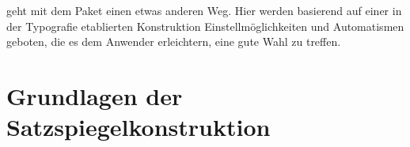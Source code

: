 \KOMAScript{} geht mit dem Paket  einen etwas anderen
Weg. Hier werden basierend auf einer in der Typografie etablierten
Konstruktion Einstellmöglichkeiten und Automatismen geboten, die es dem
Anwender erleichtern, eine gute Wahl zu treffen.

\iffalse%
  Es wird darauf hingewiesen, dass sich \Package{typearea} des Pakets
  \Package{scrbase} bedient. Letzteres Paket ist im Expertenteil
  \iffree{dieser Anleitung}{dieses Buches} in \autoref{cha:scrbase} ab
  \autopageref{cha:scrbase} erklärt. 
  Die Mehrzahl der dort dokumentierten Anweisungen richtet sich jedoch nicht
  an Anwender, sondern an Klassen- und Paketautoren.%
\fi

\section{Grundlagen der Satzspiegelkonstruktion}

